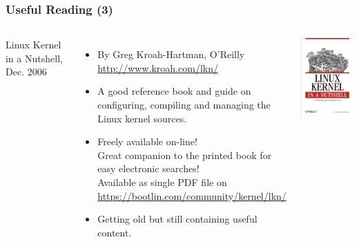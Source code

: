 \begin{frame}
  \frametitle{Useful Reading (3)}
  \begin{columns}
    Linux Kernel in a Nutshell, Dec. 2006
    \begin{itemize}
    \item By Greg Kroah-Hartman, O'Reilly\\
      \url{http://www.kroah.com/lkn/}
    \item A good reference book and guide on configuring, compiling
      and managing the Linux kernel sources.
    \item Freely available on-line!\\
      Great companion to the printed book for easy electronic searches!\\
      Available as single PDF file on
      \url{https://bootlin.com/community/kernel/lkn/}
    \item Getting old but still containing useful content.
    \end{itemize}
    \includegraphics[width=\textwidth]{slides/kernel-resources-references/linux-kernel-in-a-nutshell.jpg}
  \end{columns}
\end{frame}

